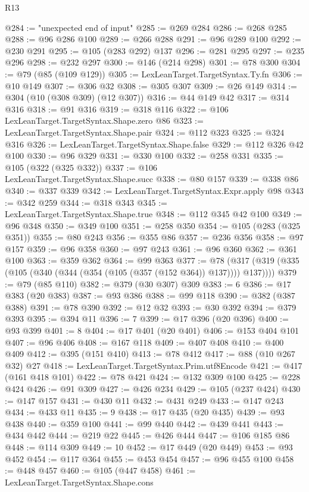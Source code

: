 \begin{lexlean}{R13}
\begin{coremodule}
@284 := "unexpected end of input"
@285 := @269 @284
@286 := @268 @285
@288 := @96 @286 @100
@289 := @266 @288
@291 := @96 @289 @100
@292 := @230 @291
@295 := @105 (@283 @292) @137
@296 := @281 @295
@297 := @235 @296
@298 := @232 @297
@300 := @146 (@214 @298)
@301 := @78 @300
@304 := @79 (@85 (@109 @129))
@305 := LexLeanTarget.TargetSyntax.Ty.fn
@306 := @10 @149
@307 := @306 @32
@308 := @305 @307
@309 := @26 @149
@314 := @304 (@10 (@308 @309) (@12 @307))
@316 := @44 @149 @42
@317 := @314 @316
@318 := @91 @316
@319 := @318 @116
@322 := @106 LexLeanTarget.TargetSyntax.Shape.zero @86
@323 := LexLeanTarget.TargetSyntax.Shape.pair
@324 := @112 @323
@325 := @324 @316
@326 := LexLeanTarget.TargetSyntax.Shape.false
@329 := @112 @326 @42 @100
@330 := @96 @329
@331 := @330 @100
@332 := @258 @331
@335 := @105 (@322 (@325 @332))
@337 := @106 LexLeanTarget.TargetSyntax.Shape.succ
@338 := @80 @157
@339 := @338 @86
@340 := @337 @339
@342 := LexLeanTarget.TargetSyntax.Expr.apply @98
@343 := @342 @259
@344 := @318 @343
@345 := LexLeanTarget.TargetSyntax.Shape.true
@348 := @112 @345 @42 @100
@349 := @96 @348
@350 := @349 @100
@351 := @258 @350
@354 := @105 (@283 (@325 @351))
@355 := @80 @243
@356 := @355 @86
@357 := @236 @356
@358 := @97 @157
@359 := @96 @358
@360 := @97 @243
@361 := @96 @360
@362 := @361 @100
@363 := @359 @362
@364 := @99 @363
@377 := @78 (@317 (@319 (@335 (@105 (@340 (@344 (@354 (@105 (@357 (@152 @364)) @137)))) @137))))
@379 := @79 (@85 @110)
@382 := @379 (@30 @307) @309
@383 := 6
@386 := @17 @383 (@20 @383)
@387 := @93 @386
@388 := @99 @118
@390 := @382 (@387 @388)
@391 := @78 @390
@392 := @12 @32
@393 := @30 @392
@394 := @379 @393
@395 := @394 @11
@396 := 7
@399 := @17 @396 (@20 @396)
@400 := @93 @399
@401 := 8
@404 := @17 @401 (@20 @401)
@406 := @153 @404 @101
@407 := @96 @406
@408 := @167 @118
@409 := @407 @408
@410 := @400 @409
@412 := @395 (@151 @410)
@413 := @78 @412
@417 := @88 (@10 @267 @32) @27
@418 := LexLeanTarget.TargetSyntax.Prim.utf8Encode
@421 := @417 (@161 @418 @101)
@422 := @78 @421
@424 := @132 @309 @100
@425 := @228 @424
@426 := @91 @309
@427 := @426 @234
@429 := @105 (@237 @424)
@430 := @147 @157
@431 := @430 @11
@432 := @431 @249
@433 := @147 @243
@434 := @433 @11
@435 := 9
@438 := @17 @435 (@20 @435)
@439 := @93 @438
@440 := @359 @100
@441 := @99 @440
@442 := @439 @441
@443 := @434 @442
@444 := @219 @22
@445 := @426 @444
@447 := @106 @185 @86
@448 := @114 @309
@449 := 10
@452 := @17 @449 (@20 @449)
@453 := @93 @452
@454 := @117 @364
@455 := @453 @454
@457 := @96 @455 @100
@458 := @448 @457
@460 := @105 (@447 @458)
@461 := LexLeanTarget.TargetSyntax.Shape.cons

\end{coremodule}
\end{lexlean}
